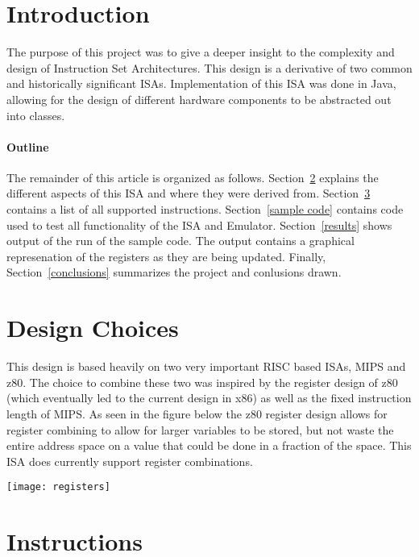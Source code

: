 \documentclass[12pt]{article}
\begin{document}
\maketitle



\section{Introduction}
The purpose of this project was to give a deeper insight to the complexity and design of Instruction Set Architectures.
This design is a derivative of two common and historically significant ISAs. Implementation of this ISA was done in Java,
allowing for the design of different hardware components to be abstracted out into classes. 

\paragraph{Outline}
The remainder of this article is organized as follows.
Section~\ref{design choices} explains the different aspects of this ISA
and where they were derived from. 
Section~\ref{instructions} contains a list of all supported instructions. 
Section~\ref{sample code} contains code used to test all functionality of the ISA and Emulator.
Section~\ref{results} shows output of the run of the sample code. The output contains a graphical represenation of the registers as they are being updated. 
Finally, Section~\ref{conclusions} summarizes the project and conlusions drawn.

\section{Design Choices}\label{design choices}
This design is based heavily on two very important RISC based ISAs, MIPS and z80. The choice to combine these two was inspired by the register design 
of z80 (which eventually led to the current design in x86) as well as the fixed instruction length of MIPS. As seen in the figure below the z80 
register design allows for register combining to allow for larger variables to be stored, but not waste the entire address space on a value that 
could be done in a fraction of the space. This ISA does currently support register combinations. 

\centerline{\texttt{[image: registers]}}

\section{Instructions}\label{instructions}
\end{document}
